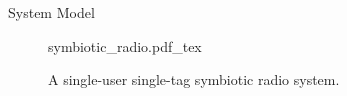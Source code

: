 \documentclass[journal]{IEEEtran}
\begin{document}
	\begin{section}{System Model}
		\begin{figure}[!t]
			\centering
			\def\svgwidth{0.9\columnwidth}
			{symbiotic_radio.pdf_tex}
			\caption{A single-user single-tag symbiotic radio system.}
			\label{fi:symbiotic_radio}
		\end{figure}
\end{section}
\end{document}
